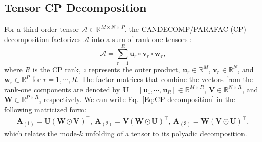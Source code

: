 \documentclass[12pt]{article}
\begin{document}
\subsection{Tensor CP Decomposition}
For a third-order tensor $\boldsymbol{\mathcal{A}}\in\mathbb{R}^{M\times N\times P}$, the CANDECOMP/PARAFAC (CP) decomposition factorizes $\boldsymbol{\mathcal{A}}$ into a sum of rank-one tensors \citep{kolda2009tensor}:
\begin{equation} \label{Eq:CP decomposition}
    \boldsymbol{\mathcal{A}}=\sum_{r=1}^{R}\boldsymbol{u}_{r}\circ\boldsymbol{v}_{r}\circ\boldsymbol{w}_{r},
\end{equation}
where $R$ is the CP rank, $\circ$ represents the outer product, $\boldsymbol{u}_{r}\in\mathbb{R}^{M}$, $\boldsymbol{v}_{r}\in\mathbb{R}^{N}$, and $\boldsymbol{w}_{r}\in\mathbb{R}^{P}$ for $r=1,\cdots,R$. The factor matrices that combine the vectors from the rank-one components are denoted by $\boldsymbol{U}=[\boldsymbol{u}_{1},\cdots,\boldsymbol{u}_{R}]\in\mathbb{R}^{M\times R}$, $\boldsymbol{V}\in\mathbb{R}^{N\times R}$, and $\boldsymbol{W}\in\mathbb{R}^{P\times R}$, respectively. We can write Eq.~\eqref{Eq:CP decomposition} in the following matricized form:
\begin{equation} \label{Eq:unfolding-CP}
    \begin{split}
        \boldsymbol{A}_{(1)}=\boldsymbol{U}\left(\boldsymbol{W}\odot\boldsymbol{V}\right)^{\top},~ 
        \boldsymbol{A}_{(2)}=\boldsymbol{V}\left(\boldsymbol{W}\odot\boldsymbol{U}\right)^{\top},~ 
        \boldsymbol{A}_{(3)}=\boldsymbol{W}\left(\boldsymbol{V}\odot\boldsymbol{U}\right)^{\top},
    \end{split}
\end{equation}
which relates the mode-$k$ unfolding of a tensor to its polyadic decomposition. %

\end{document}
